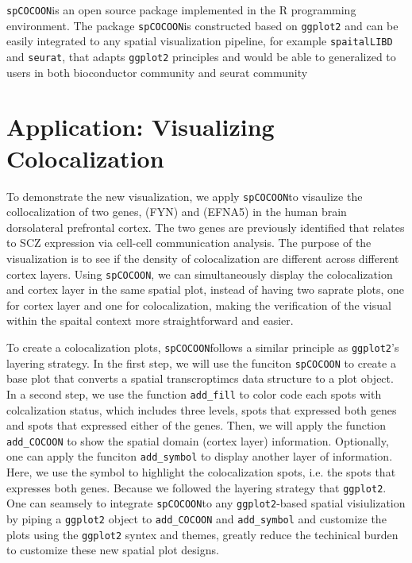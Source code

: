 \documentclass[11pt]{article}
\newcommand{\coloc}{\texttt{spCOCOON}}
\begin{document}
\coloc is  an open source package implemented in the R programming environment. The package \coloc is constructed based on \texttt{ggplot2} and can be easily integrated to any spatial visualization pipeline, for example \texttt{spaitalLIBD} and \texttt{seurat}, that adapts \texttt{ggplot2} principles and would be able to generalized to users in both bioconductor community and seurat community

\section*{Application: Visualizing Colocalization}
To demonstrate the new visualization, we apply \coloc to visaulize the collocalization of two genes, (FYN) and (EFNA5) in the human brain dorsolateral prefrontal cortex. The two genes are previously identified that relates to SCZ expression via cell-cell communication analysis. The purpose of the visualization is to see if the density of colocalization are different across different cortex layers. Using \coloc, we can simultaneously display the colocalization and cortex layer in the same spatial plot, instead of having two saprate plots, one for cortex layer and one for colocalization, making the verification of the visual within the spaital context more straightforward and easier. 

To create a colocalization plots, \coloc follows a similar principle as \texttt{ggplot2}'s layering strategy. In the first step, we will use the funciton \texttt{spCOCOON} to create a base plot that converts a spatial transcroptimcs data structure to a plot object. In a second step, we use the function \texttt{add\_fill} to color code each spots with colcalization status, which includes three levels, spots that expressed both genes and spots that expressed either of the genes. Then, we will apply the function \texttt{add\_COCOON} to show the spatial domain (cortex layer) information. Optionally, one can apply the funciton \texttt{add\_symbol} to display another layer of information. Here, we use  the symbol to highlight the colocalization spots, i.e. the spots that expresses both genes. Because we followed the layering strategy that \texttt{ggplot2}. One can seamsely to integrate \coloc to any \texttt{ggplot2}-based spatial visiulization by piping a \texttt{ggplot2} object to \texttt{add\_COCOON} and \texttt{add\_symbol} and customize the plots using the \texttt{ggplot2} syntex and themes, greatly reduce the techinical burden to customize these new spatial plot designs.  
\end{document}
